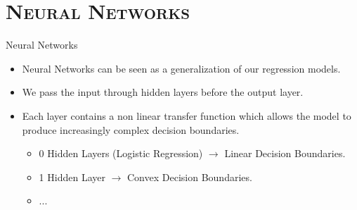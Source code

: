 \section{\scshape Neural Networks}
\begin{frame}{Neural Networks}
	\begin{itemize}
		\item Neural Networks can be seen as a generalization of our regression models.
		\item We pass the input through hidden layers before the output layer.
		\item Each layer contains a non linear transfer function which allows the model to produce increasingly complex decision boundaries.
		\begin{itemize}
			\item 0 Hidden Layers (Logistic Regression) $\rightarrow$ Linear Decision Boundaries.
			\item 1 Hidden Layer $\rightarrow$ Convex Decision Boundaries.
			\item ...
		\end{itemize}
	\end{itemize}
\end{frame}


